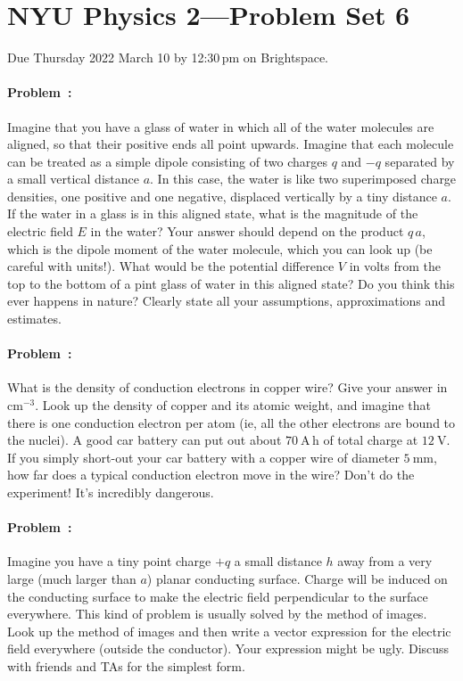 \documentclass[12pt]{article}
\begin{document}
\section*{NYU Physics 2---Problem Set 6}

Due Thursday 2022 March 10 by 12:30\,pm on Brightspace.

\paragraph{Problem~\theproblem:}%
Imagine that you have a glass of water in which all of the water
molecules are aligned, so that their positive ends all point upwards.
Imagine that each molecule can be treated as a simple dipole
consisting of two charges $q$ and $-q$ separated by a small vertical
distance $a$.  In this case, the water is like two superimposed charge
densities, one positive and one negative, displaced vertically by a
tiny distance $a$.  If the water in a glass is in this aligned state,
what is the magnitude of the electric field $E$ in the water?  Your
answer should depend on the product $q\,a$, which is the dipole moment
of the water molecule, which you can look up (be careful with units!).  What would
be the potential difference $V$ in volts from the top to the bottom of
a pint glass of water in this aligned state? Do you think this ever
happens in nature? Clearly state all your assumptions, approximations
and estimates.

\paragraph{Problem~\theproblem:}%
What is the density of conduction electrons in copper wire?  Give your
answer in $\mathrm{cm^{-3}}$. Look up the density of copper and its
atomic weight, and imagine that there is one conduction electron per
atom (ie, all the other electrons are bound to the nuclei).  A good
car battery can put out about $70~\mathrm{A\,h}$ of total charge at
$12~\mathrm{V}$. If you simply short-out your car battery with a
copper wire of diameter $5~\mathrm{mm}$, how far does a typical
conduction electron move in the wire? Don't do the experiment! It's
incredibly dangerous.

\paragraph{Problem~\theproblem:}%
Imagine you have a tiny point charge $+q$ a small distance $h$ away
from a very large (much larger than $a$) planar conducting surface. Charge
will be induced on the conducting surface to make the electric field
perpendicular to the surface everywhere. This kind of problem is usually
solved by the method of images. Look up the method of images and
then write a vector expression for the electric field everywhere (outside
the conductor). Your expression might be ugly. Discuss with friends and
TAs for the simplest form.
\end{document}
